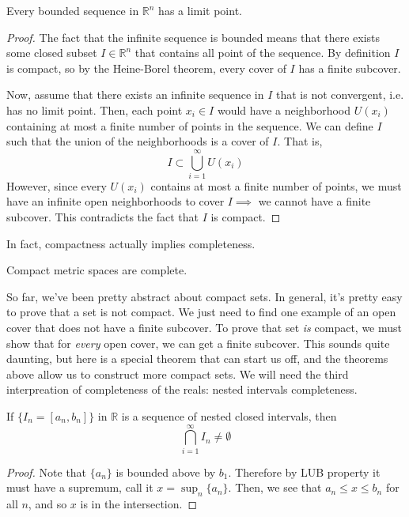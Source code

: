   \begin{theorem}
    Every bounded sequence in $\mathbb{R}^n$ has a limit point. 
  \end{theorem}
  \begin{proof}
    The fact that the infinite sequence is bounded means that there exists some closed subset $I \in \mathbb{R}^n$ that contains all point of the sequence. By definition $I$ is compact, so by the Heine-Borel theorem, every cover of $I$ has a finite subcover. 

    Now, assume that there exists an infinite sequence in $I$ that is not convergent, i.e. has no limit point. Then, each point $x_i \in I$ would have a neighborhood $U(x_i)$ containing at most a finite number of points in the sequence. We can define $I$ such that the union of the neighborhoods is a cover of $I$. That is, 
    \[I \subset \bigcup_{i=1}^\infty U(x_i)\]
    However, since every $U(x_i)$ contains at most a finite number of points, we must have an infinite open neighborhoods to cover $I \implies$ we cannot have a finite subcover. This contradicts the fact that $I$ is compact. 
  \end{proof}

  In fact, compactness actually implies completeness. 

  \begin{theorem}
    Compact metric spaces are complete. 
  \end{theorem} 

  So far, we've been pretty abstract about compact sets. In general, it's pretty easy to prove that a set is not compact. We just need to find one example of an open cover that does not have a finite subcover. To prove that set \textit{is} compact, we must show that for \textit{every} open cover, we can get a finite subcover. This sounds quite daunting, but here is a special theorem that can start us off, and the theorems above allow us to construct more compact sets. We will need the third interpreation of completeness of the reals: nested intervals completeness.

  \begin{theorem}
    If $\{I_n = [a_n, b_n]\}$ in $\mathbb{R}$ is a sequence of nested closed intervals, then 
    \begin{equation}
      \bigcap_{i=1}^\infty I_n \neq \emptyset
    \end{equation}
  \end{theorem}
  \begin{proof}
    Note that $\{a_n\}$ is bounded above by $b_1$. Therefore by LUB property it must have a supremum, call it $x = \sup_n \{a_n\}$. Then, we see that $a_n \leq x \leq b_n$ for all $n$, and so $x$ is in the intersection. 
  \end{proof}

